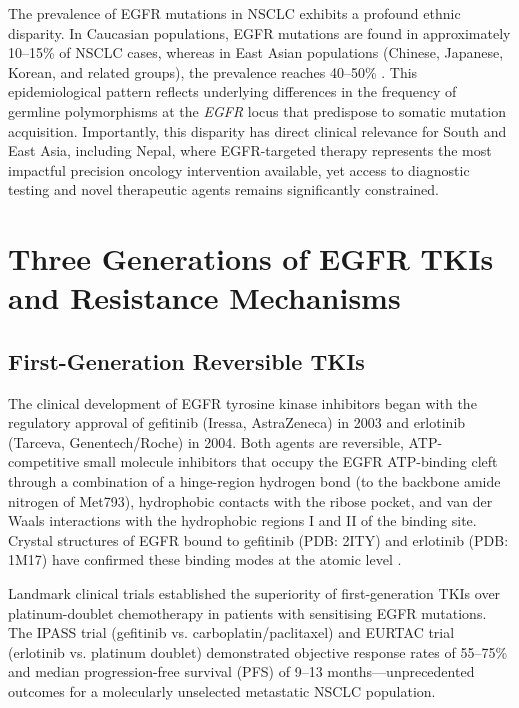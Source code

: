 The prevalence of EGFR mutations in NSCLC exhibits a profound ethnic disparity.
In Caucasian populations, EGFR mutations are found in approximately 10--15\% of
NSCLC cases, whereas in East Asian populations (Chinese, Japanese, Korean, and
related groups), the prevalence reaches 40--50\% \parencite{leonetti2019resistance}.
This epidemiological pattern reflects underlying differences in the frequency of
germline polymorphisms at the \textit{EGFR} locus that predispose to somatic
mutation acquisition. Importantly, this disparity has direct clinical relevance
for South and East Asia, including Nepal, where EGFR-targeted therapy represents
the most impactful precision oncology intervention available, yet access to
diagnostic testing and novel therapeutic agents remains significantly constrained.

\section{Three Generations of EGFR TKIs and Resistance Mechanisms}
\label{sec:tki_gen}

\subsection{First-Generation Reversible TKIs}

The clinical development of EGFR tyrosine kinase inhibitors began with the
regulatory approval of gefitinib (Iressa, AstraZeneca) in 2003 and erlotinib
(Tarceva, Genentech/Roche) in 2004. Both agents are reversible, ATP-competitive
small molecule inhibitors that occupy the EGFR ATP-binding cleft through a
combination of a hinge-region hydrogen bond (to the backbone amide nitrogen of
Met793), hydrophobic contacts with the ribose pocket, and van der Waals interactions
with the hydrophobic regions I and II of the binding site. Crystal structures of
EGFR bound to gefitinib (PDB: 2ITY) and erlotinib (PDB: 1M17) have confirmed
these binding modes at the atomic level \parencite{stamos2002egfr}.

Landmark clinical trials established the superiority of first-generation TKIs
over platinum-doublet chemotherapy in patients with sensitising EGFR mutations.
The IPASS trial (gefitinib vs. carboplatin/paclitaxel) and EURTAC trial
(erlotinib vs. platinum doublet) demonstrated objective response rates of
55--75\% and median progression-free survival (PFS) of 9--13 months---unprecedented
outcomes for a molecularly unselected metastatic NSCLC population.

